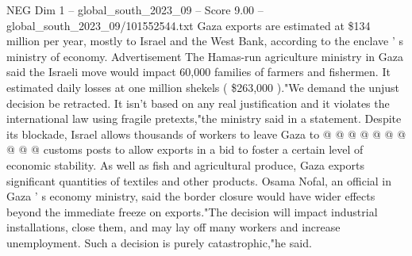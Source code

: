 \begin{textsample}{NEG Dim 1 – global\_south\_2023\_09 – Score 9.00 – global\_south\_2023\_09/101552544.txt}
Gaza exports are estimated at \$134 million per year, mostly to Israel and the West Bank, according to the enclave ' s ministry of economy.
Advertisement The Hamas-run agriculture ministry in Gaza said the Israeli move would impact 60,000 families of farmers and fishermen.
It estimated daily losses at one million shekels ( \$263,000 )."We demand the unjust decision be retracted.
It isn't based on any real justification and it violates the international law using fragile pretexts,"the ministry said in a statement.
Despite its blockade, Israel allows thousands of workers to leave Gaza to @ @ @ @ @ @ @ @ @ @ customs posts to allow exports in a bid to foster a certain level of economic stability.
As well as fish and agricultural produce, Gaza exports significant quantities of textiles and other products.
Osama Nofal, an official in Gaza ' s economy ministry, said the border closure would have wider effects beyond the immediate freeze on exports."The decision will impact industrial installations, close them, and may lay off many workers and increase unemployment.
Such a decision is purely catastrophic,"he said.

\end{textsample}
